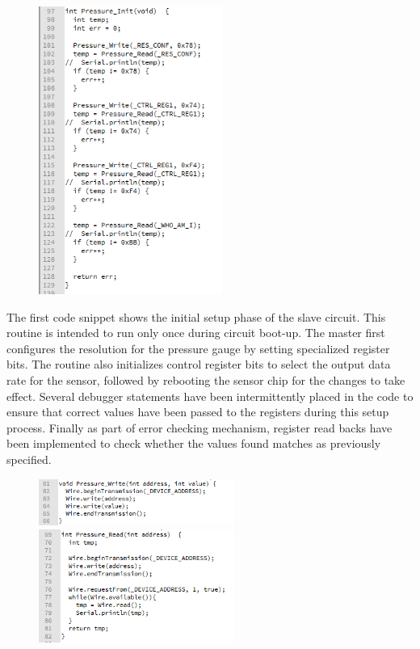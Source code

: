 \documentclass{article}
\begin{document}
\begin{figure}[!ht]
\centering 
\includegraphics[width=6cm]{1.png}
\end{figure}

\begin{flushleft}
The first code snippet shows the initial setup phase of the slave circuit. This routine is intended to run only once during circuit boot-up. The master first configures the resolution for the pressure gauge by setting specialized register bits. The routine also initializes control register bits to select the output data rate for the sensor, followed by rebooting the sensor chip for the changes to take effect. Several debugger statements have been intermittently placed in the code to ensure that correct values have been passed to the registers during this setup process. Finally as part of error checking mechanism, register read backs have been implemented to check whether the values found matches as previously specified. 
\end{flushleft}

\begin{figure}[!ht]
\centering 
\includegraphics[width=6.4cm]{2.png}
\includegraphics[width=6.4cm]{3.png}
\end{figure}
\end{document}
